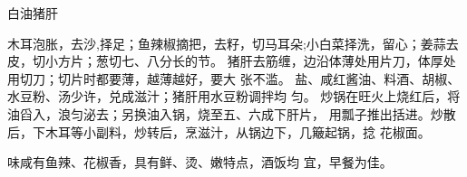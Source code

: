 \begin{recipe}{白油猪肝}

\ingredients


\preparation

\step 木耳泡胀，去沙,择足；鱼辣椒摘把，去籽，切马耳朵;小白菜择洗，留心；姜蒜去
皮，切小方片；葱切七、八分长的节。
\step 猪肝去筋缠，边沿体薄处用片刀，体厚处用切刀；切片时都要薄，越薄越好，要大
张不滥。
\step 盐、咸红酱油、料酒、胡椒、水豆粉、汤少许，兑成滋汁；猪肝用水豆粉调拌均
匀。
\step 炒锅在旺火上烧红后，将油舀入，浪匀泌去；另换油入锅，烧至五、六成下肝片，
用瓢子推出括进。炒散后，下木耳等小副料，炒转后，烹滋汁，从锅边下，几簸起锅，捻
花椒面。

\features

味咸有鱼辣、花椒香，具有鲜、烫、嫩特点，酒饭均 宜，早餐为佳。

\end{recipe}

